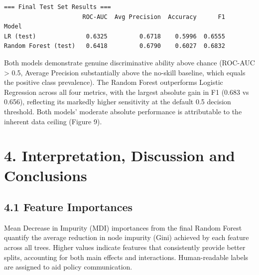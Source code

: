\documentclass[11pt]{article}
\begin{document}
    \begin{Verbatim}[commandchars=\\\{\}]
=== Final Test Set Results ===
                      ROC-AUC  Avg Precision  Accuracy      F1
Model
LR (test)              0.6325         0.6718    0.5996  0.6555
Random Forest (test)   0.6418         0.6790    0.6027  0.6832
    \end{Verbatim}

    Both models demonstrate genuine discriminative ability above chance
(ROC-AUC \textgreater{} 0.5, Average Precision substantially above the
no-skill baseline, which equals the positive class prevalence). The
Random Forest outperforms Logistic Regression across all four metrics,
with the largest absolute gain in F1 (0.683 vs 0.656), reflecting its
markedly higher sensitivity at the default 0.5 decision threshold. Both
models' moderate absolute performance is attributable to the inherent
data ceiling (Figure 9).

    \hypertarget{interpretation-discussion-and-conclusions}{%
\section{4. Interpretation, Discussion and
Conclusions}\label{interpretation-discussion-and-conclusions}}

    \hypertarget{feature-importances}{%
\subsection{4.1 Feature Importances}\label{feature-importances}}

Mean Decrease in Impurity (MDI) importances from the final Random Forest
quantify the average reduction in node impurity (Gini) achieved by each
feature across all trees. Higher values indicate features that
consistently provide better splits, accounting for both main effects and
interactions. Human-readable labels are assigned to aid policy
communication.
\end{document}
